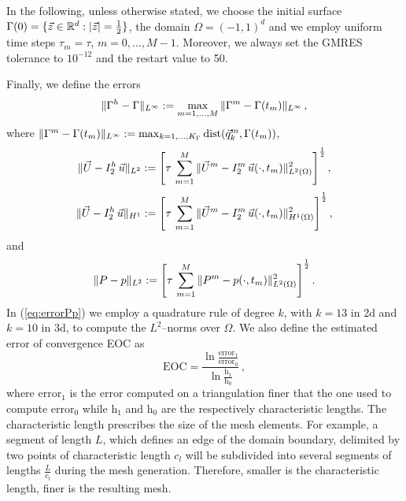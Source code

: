 In the following, unless otherwise stated, we choose the initial surface
$\Gamma(0) = \{ \vec z \in {\mathbb R}^d : |\vec z| = \frac12 \}$, the domain
$\Omega = (-1,1)^d$ and we employ uniform time steps $\tau_m=\tau$,
$m=0,\ldots, M-1$. Moreover, we always set the GMRES tolerance to $10^{-12}$ and
the restart value to 50.

Finally, we define the errors
\begin{equation} \label{eq:errorXx}
\|\Gamma^h - \Gamma\|_{L^\infty} := \max_{m=1,\ldots, M} \|\Gamma^m - \Gamma(t_m)\|_{L^\infty}\,,
\end{equation}
where $\|\Gamma^m - \Gamma(t_m)\|_{L^\infty} :=
\max_{k=1,\ldots, K_\Gamma} {\rm dist}( \vec{q}^m_k, \Gamma(t_m))$,
\begin{equation} \label{eq:errorLUu}
\|\vec U - I^h_{2}\,\vec u\|_{L^2} := \left[\tau\,\sum_{m=1}^M \|\vec U^m - I^m_2\,\vec u(\cdot,
t_m)\|_{L^2(\Omega)}^2 \right]^\frac12,
\end{equation}
\begin{equation} \label{eq:errorHUu}
\|\vec U - I^h_{2}\,\vec u\|_{H^1} := \left[\tau\,\sum_{m=1}^M \|\vec U^m - I^m_2\,\vec u(\cdot,
t_m)\|_{H^1(\Omega)}^2 \right]^\frac12,
\end{equation}
and
\begin{equation} \label{eq:errorPp}
\|P - p\|_{L^2} := \left[\tau\,\sum_{m=1}^M \|P^m - p(\cdot,t_m)\|_{L^2(\Omega)}^2
\right]^\frac12.
\end{equation}
In (\ref{eq:errorPp}) we employ a quadrature rule of degree $k$, with $k=13$ in
2d and $k=10$ in 3d, to compute the $L^2$--norms over $\Omega$. We also define
the estimated error of convergence EOC as
\begin{equation} \label{eq:eoc}
\mbox{EOC}=\frac{\ln{\frac{\mbox{error}_1}{\mbox{error}_0}}}
{\ln{\frac{\mbox{h}_1}{\mbox{h}_0}}}\,,
\end{equation}
where $\mbox{error}_1$ is the error computed on a triangulation finer that the
one used to compute $\mbox{error}_0$ while $\mbox{h}_1$ and $\mbox{h}_0$ are the
respectively characteristic lengths. The characteristic length prescribes the
size of the mesh elements. For example, a segment of length $L$, which defines
an edge of the domain boundary, delimited by two points of characteristic
length $c_l$ will be subdivided into several segments of lengths
$\frac{L}{c_l}$ during the mesh generation. Therefore, smaller is the
characteristic length, finer is the resulting mesh.

